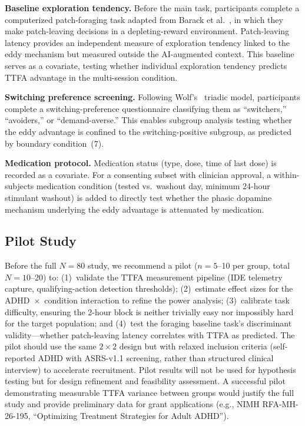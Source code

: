 \documentclass[sigconf,nonacm]{acmart}
\begin{document}
\textbf{Baseline exploration tendency.} Before the main task, participants complete a computerized patch-foraging task adapted from Barack et al.~\cite{barack2024}, in which they make patch-leaving decisions in a depleting-reward environment. Patch-leaving latency provides an independent measure of exploration tendency linked to the eddy mechanism but measured outside the AI-augmented context. This baseline serves as a covariate, testing whether individual exploration tendency predicts TTFA advantage in the multi-session condition.

\textbf{Switching preference screening.} Following Wolf's~\cite{wolf2025} triadic model, participants complete a switching-preference questionnaire classifying them as ``switchers,'' ``avoiders,'' or ``demand-averse.'' This enables subgroup analysis testing whether the eddy advantage is confined to the switching-positive subgroup, as predicted by boundary condition~(7).

\textbf{Medication protocol.} Medication status (type, dose, time of last dose) is recorded as a covariate. For a consenting subset with clinician approval, a within-subjects medication condition (tested vs.\ washout day, minimum 24-hour stimulant washout) is added to directly test whether the phasic dopamine mechanism underlying the eddy advantage is attenuated by medication.

\subsection{Pilot Study}

Before the full $N = 80$ study, we recommend a pilot ($n = 5$--10 per group, total $N = 10$--20) to: (1)~validate the TTFA measurement pipeline (IDE telemetry capture, qualifying-action detection thresholds); (2)~estimate effect sizes for the ADHD~$\times$~condition interaction to refine the power analysis; (3)~calibrate task difficulty, ensuring the 2-hour block is neither trivially easy nor impossibly hard for the target population; and (4)~test the foraging baseline task's discriminant validity---whether patch-leaving latency correlates with TTFA as predicted. The pilot should use the same $2 \times 2$ design but with relaxed inclusion criteria (self-reported ADHD with ASRS-v1.1 screening, rather than structured clinical interview) to accelerate recruitment. Pilot results will not be used for hypothesis testing but for design refinement and feasibility assessment. A successful pilot demonstrating measurable TTFA variance between groups would justify the full study and provide preliminary data for grant applications (e.g., NIMH RFA-MH-26-195, ``Optimizing Treatment Strategies for Adult ADHD'').
\end{document}
